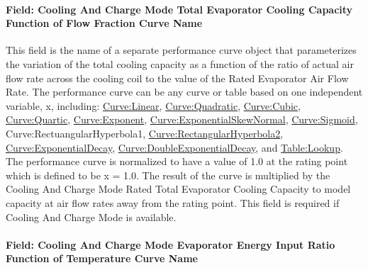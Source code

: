 \paragraph{Field: Cooling And Charge Mode Total Evaporator Cooling Capacity Function of Flow Fraction Curve Name}\label{field-cooling-and-charge-mode-total-evaporator-cooling-capacity-function-of-flow-fraction-curve-name}

This field is the name of a separate performance curve object that parameterizes the variation of the total cooling capacity as a function of the ratio of actual air flow rate across the cooling coil to the value of the Rated Evaporator Air Flow Rate. The performance curve can be any curve or table based on one independent variable, x, including: \hyperref[curvelinear]{Curve:Linear}, \hyperref[curvequadratic]{Curve:Quadratic}, \hyperref[curvecubic]{Curve:Cubic}, \hyperref[curvequartic]{Curve:Quartic}, \hyperref[curveexponent]{Curve:Exponent}, \hyperref[curveexponentialskewnormal]{Curve:ExponentialSkewNormal}, \hyperref[curvesigmoid]{Curve:Sigmoid}, Curve:RectuangularHyperbola1, \hyperref[curverectangularhyperbola2]{Curve:RectangularHyperbola2}, \hyperref[curveexponentialdecay]{Curve:ExponentialDecay}, \hyperref[curvedoubleexponentialdecay]{Curve:DoubleExponentialDecay}, and \hyperref[tablelookup]{Table:Lookup}. The performance curve is normalized to have a value of 1.0 at the rating point which is defined to be x = 1.0. The result of the curve is multiplied by the Cooling And Charge Mode Rated Total Evaporator Cooling Capacity to model capacity at air flow rates away from the rating point. This field is required if Cooling And Charge Mode is available.

\paragraph{Field: Cooling And Charge Mode Evaporator Energy Input Ratio Function of Temperature Curve Name}\label{field-cooling-and-charge-mode-evaporator-energy-input-ratio-function-of-temperature-curve-name}

